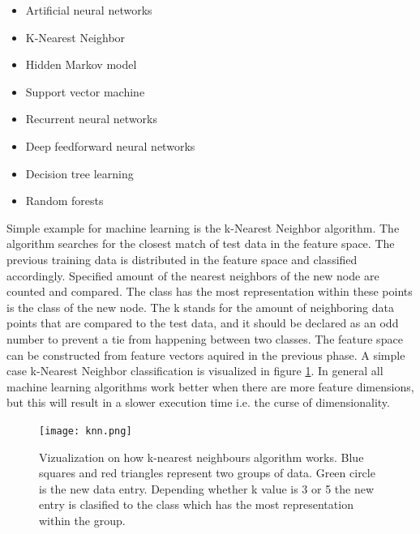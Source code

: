 \documentclass{article}
\begin{document}
        \begin{itemize}
          \item Artificial neural networks
          \item K-Nearest Neighbor
          \item Hidden Markov model
          \item Support vector machine
          \item Recurrent neural networks
          \item Deep feedforward neural networks
          \item Decision tree learning
          \item Random forests
        \end{itemize}

          Simple example for machine learning is the k-Nearest Neighbor algorithm. The algorithm searches for the closest match of test data in the feature space. The previous training data is distributed in the feature space and classified accordingly. Specified amount of the nearest neighbors of the new node are counted and compared. The class has the most representation within these points is the class of the new node. The k stands for the amount of neighboring data points that are compared to the test data, and it should be declared as an odd number to prevent a tie from happening between two classes. The feature space can be constructed from feature vectors aquired in the previous phase. A simple case k-Nearest Neighbor classification is visualized in figure \ref{fig:knn}. In general all machine learning algorithms work better when there are more feature dimensions, but this will result in a slower execution time i.e. the curse of dimensionality.\cite{Beyer}

          \begin{figure}
            \centering
            \texttt{[image: knn.png]}
            \caption{Vizualization on how k-nearest neighbours algorithm works. Blue squares
                      and red triangles represent two groups of data. Green circle is the new
                      data entry. Depending whether k value is 3 or 5 the new entry is clasified
                      to the class which has the most representation within the group.\label{fig:knn} }
          \end{figure}
\end{document}
